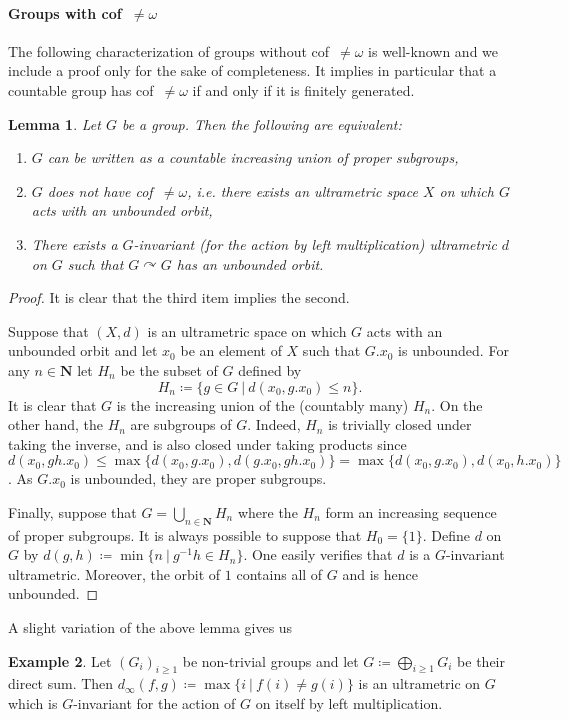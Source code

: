 \documentclass[a4paper]{article}
\newtheorem{lem}{Lemma}[section]
\theoremstyle{definition}
\newtheorem{exmp}[lem]{Example}
\newcommand*{\field}[1]{\mathbf{#1}}
\newcommand*{\N}{\field{N}}
\newcommand{\setst}[2]{\{#1\ |\ #2\}}
\begin{document}
\paragraph{Groups with cof~$\neq\omega$}
The following characterization of groups without cof~$\neq\omega$ is well-known and we include a proof only for the sake of completeness.
It implies in particular that a countable group has cof~$\neq\omega$ if and only if it is finitely generated.
%
%
\begin{lem}\label{Lemma:CofSub}
Let $G$ be a group. Then the following are equivalent:
\begin{enumerate}
\item $G$ can be written as a countable increasing union of proper subgroups,
\item $G$ does not have cof~$\neq\omega$, i.e. there exists an ultrametric space $X$ on which $G$ acts with an unbounded orbit,
\item There exists a $G$-invariant (for the action by left multiplication) ultrametric $d$ on $G$ such that $G\curvearrowright G$ has an unbounded orbit.
\end{enumerate}
\end{lem}
\begin{proof}
It is clear that the third item implies the second.

Suppose that $(X,d)$ is an ultrametric space on which $G$ acts with an unbounded orbit and let $x_0$ be an element of $X$ such that $G.x_0$ is unbounded. For any $n\in \N$ let $H_n$ be the subset of $G$ defined by
\[
	H_n\coloneqq\setst{g\in G}{d(x_0,g.x_0)\leq n}.
\]
It is clear that $G$ is the increasing union of the (countably many) $H_n$.
On the other hand, the $H_n$ are subgroups of $G$. Indeed, $H_n$ is trivially closed under taking the inverse, and is also closed under taking products since $d(x_0,gh.x_0)\leq\max\{d(x_0,g.x_0),d(g.x_0,gh.x_0)\}=\max\{d(x_0,g.x_0),d(x_0,h.x_0)\}$. As $G.x_0$ is unbounded, they are proper subgroups.

Finally, suppose that $G=\bigcup_{n\in \N}H_n$ where the $H_n$ form an increasing sequence of proper subgroups. It is always possible to suppose that $H_0=\{1\}$.
Define $d$ on $G$ by $d(g,h)\coloneqq\min\setst{n}{g^{-1}h\in H_n}$.
One easily verifies that $d$ is a $G$-invariant ultrametric. Moreover, the orbit of $1$ contains all of $G$ and is hence unbounded.
\end{proof}
%
%
A slight variation of the above lemma gives us
\begin{exmp}\label{Exmpl:Ultra}
Let $(G_i)_{i\geq 1}$ be non-trivial groups and let $G\coloneqq\bigoplus_{i\geq 1} G_i$ be their direct sum.
Then $d_\infty(f,g)\coloneqq\max\setst{i}{f(i)\neq g(i)}$ is an ultrametric on $G$ which is $G$-invariant for the action of $G$ on itself by left multiplication.
\end{exmp}
%
%
%
%
%
%
%
%
%
%
\end{document}
